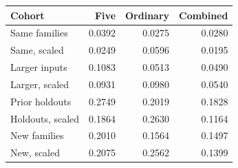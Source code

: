 \begin{tabular}{lrrr}
\toprule
Cohort & Five & Ordinary & Combined\\
\midrule
Same families & 0.0392 & 0.0275 & 0.0280\\
Same, scaled & 0.0249 & 0.0596 & 0.0195\\
Larger inputs & 0.1083 & 0.0513 & 0.0490\\
Larger, scaled & 0.0931 & 0.0980 & 0.0540\\
Prior holdouts & 0.2749 & 0.2019 & 0.1828\\
Holdouts, scaled & 0.1864 & 0.2630 & 0.1164\\
New families & 0.2010 & 0.1564 & 0.1497\\
New, scaled & 0.2075 & 0.2562 & 0.1399\\
\bottomrule
\end{tabular}
